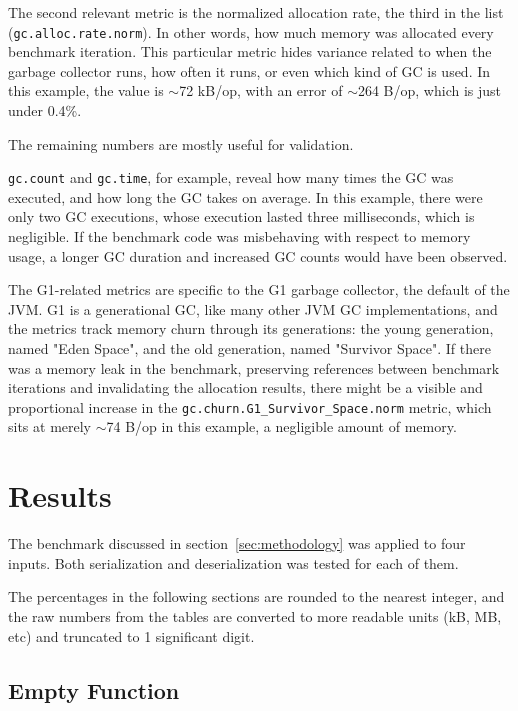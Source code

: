 \documentclass[lettersize,journal]{IEEEtran}
\begin{document}
    The second relevant metric is the normalized allocation rate, the third in the list (\texttt{gc.alloc.rate.norm}).
    In other words, how much memory was allocated every benchmark iteration.
    This particular metric hides variance related to when the garbage collector runs, how often it runs, or even which
    kind of GC is used.
    In this example, the value is $\sim$72 kB/op, with an error of $\sim$264 B/op, which is just
    under 0.4\%.

    The remaining numbers are mostly useful for validation.

    \texttt{gc.count} and \texttt{gc.time}, for example, reveal how many times the GC was executed, and how long the
    GC takes on average.
    In this example, there were only two GC executions, whose execution lasted three milliseconds, which is negligible.
    If the benchmark code was misbehaving with respect to memory usage, a longer GC duration and increased GC counts
    would have been observed.

    The G1-related metrics are specific to the G1 garbage collector, the default of the JVM\@.
    G1 is a generational GC, like many other JVM GC implementations, and the metrics track memory churn through its
    generations: the young generation, named "Eden Space", and the old generation, named "Survivor Space".
    If there was a memory leak in the benchmark, preserving references between benchmark iterations and invalidating the
    allocation results, there might be a visible and proportional increase in the
    \texttt{gc.churn.G1\_Survivor\_Space.norm} metric, which sits at merely $\sim$74 B/op in this example, a
    negligible amount of memory.

    \section{Results}\label{sec:results}

    The benchmark discussed in section~\ref{sec:methodology} was applied to four inputs.
    Both serialization and deserialization was tested for each of them.

    The percentages in the following sections are rounded to the nearest integer, and the raw numbers from the tables
    are converted to more readable units (kB, MB, etc) and truncated to 1 significant digit.

    \subsection{Empty Function}\label{subsec:empty-function}
\end{document}
